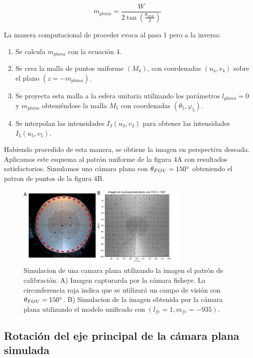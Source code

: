 \documentclass[12pt,a4paper]{article}
\begin{document}
\begin{equation}
  m_{plana} = \frac{W}{2\tan\left(\frac{\theta_{FOV}}{2}\right)}
\end{equation}

La manera computacional de proceder evoca al paso 1 pero a la inversa:

\begin{enumerate}
  \item Se calcula $m_{plana}$ con la ecuación 4.
  \item Se crea la malla de puntos uniforme $(M_4)$, con coordenadas $(u_4, v_4)$ sobre el plano $(z=-m_{plana})$. 
  \item Se proyecta esta malla a la esfera unitaria utilizando los parámetros $l_{plana}=0$ y $m_{plana}$ obteniéndose la malla $M_5$ con coordenadas  $(\theta_5, \varphi_5)$.
  \item Se interpolan las intensidades $I_3(u_3, v_3)$ para obtener las intensidades $I_5(u_5, v_5)$.
\end{enumerate}

Habiendo procedido de esta manera, se obtiene la imagen en perspectiva deseada. 
 Aplicamos este esquema al patrón uniforme de la figura 4A con resultados satisfactorios. Simulamos una cámara plana con $\theta_{FOV}=150\degree$ obteniendo el patron de puntos de la figura 4B.

\begin{figure}[!h]
  \centering
  \includegraphics[width=0.75\textwidth]{afiche.png}
  \caption{Simulacion de una camara plana utilizando la imagen el patrón de calibración. A) Imagen  capturarda por la cámara fisheye. La circunferencia roja indica que se utilizará un campo de visión con $\theta_{FOV}=150\degree$. B) Simulacion de la imagen obtenida por la cámara plana utilizando el modelo unificado con $(l_{fe}=1,m_{fe}=-935)$.}
  \label{fig:afiche}
\end{figure}

\subsection{Rotación del eje principal de la cámara plana simulada}
\end{document}
